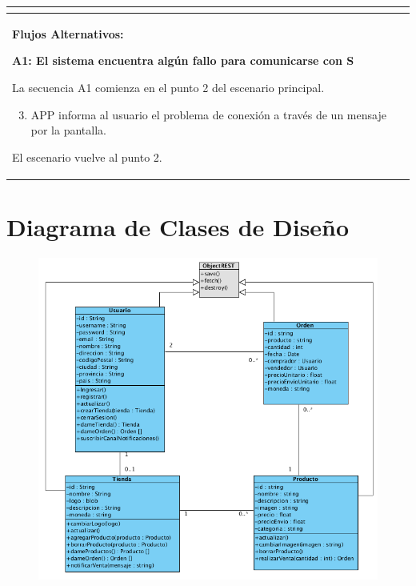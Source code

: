 \begin{longtable}{|l|p{5.5cm}|l|p{2cm}|l|p{1.9cm}|}
{    } \\ \hline

    \multicolumn{6}{|p{15cm}|}{ \textbf{Flujos Alternativos: }
    
    \textbf{A1: El sistema encuentra algún fallo para comunicarse con S}
    
    La secuencia A1 comienza en el punto 2 del escenario principal.
    \begin{enumerate}
        \setcounter{enumi}{2}
        \item APP informa al usuario el problema de conexión a través de un mensaje por la pantalla.
    \end{enumerate}

    El escenario vuelve al punto 2.

    } \\ \hline

\end{longtable}



\section{Diagrama de Clases de Diseño}

\begin{figure}[H]
  \centering
    \includegraphics[width=1\textwidth]{imagenes/disenio/clases-disenio.png}
    \label{fig:diagrama-clases-disenio}
\end{figure}

